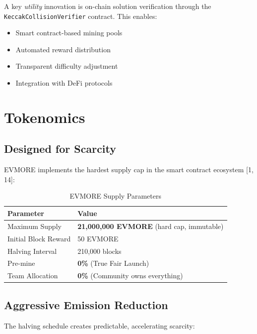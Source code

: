\documentclass[11pt,a4paper]{article}
\begin{document}
A key \textit{utility} innovation is on-chain solution verification through the \texttt{KeccakCollisionVerifier} contract. This enables:

\begin{itemize}
    \item Smart contract-based mining pools
    \item Automated reward distribution
    \item Transparent difficulty adjustment
    \item Integration with DeFi protocols
\end{itemize}

\section{Tokenomics}

\subsection{Designed for Scarcity}

EVMORE implements the hardest supply cap in the smart contract ecosystem [1, 14]:

\begin{table}[h]
\centering
\begin{tabular}{@{}ll@{}}
\toprule
\textbf{Parameter} & \textbf{Value} \\
\midrule
Maximum Supply & \textbf{21,000,000 EVMORE} (hard cap, immutable) \\
Initial Block Reward & 50 EVMORE \\
Halving Interval & 210,000 blocks \\
Pre-mine & \textbf{0\%} (True Fair Launch) \\
Team Allocation & \textbf{0\%} (Community owns everything) \\
\bottomrule
\end{tabular}
\caption{EVMORE Supply Parameters}
\end{table}

\subsection{Aggressive Emission Reduction}

The halving schedule creates predictable, accelerating scarcity:
\end{document}
